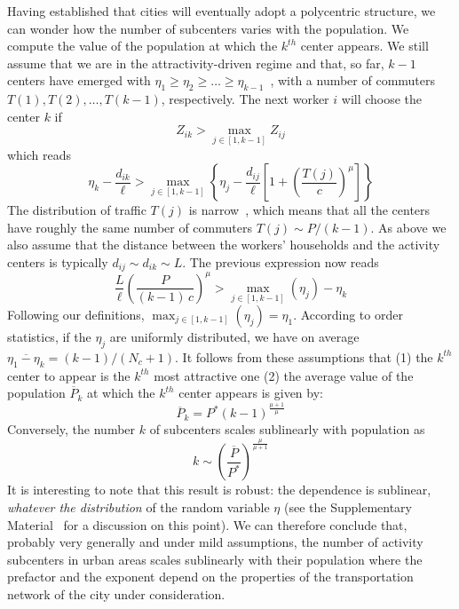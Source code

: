 Having established that cities will eventually adopt a polycentric
structure, we can wonder how the number of subcenters varies with the
population. We compute the value of the population at which 
the $k^{th}$ center appears. We still assume that we are in the attractivity-driven regime and that, so far, $k-1$
centers have emerged with $\eta_{1} \geq \eta_{2} \geq \ldots \geq
\eta_{k-1}$~\cite{SM}, with a number of commuters $T(1), T(2), \ldots,
T(k-1)$, respectively. The next worker $i$ will choose the center $k$ if
\begin{equation}
Z_{ik} > \max_{j \in \left[1,k-1\right]} Z_{ij}
\end{equation}
which reads
\begin{equation}
\eta_k - \frac{d_{ik}}{\ell} > \max_{j \in \left[1,k-1\right]} \left\{
\eta_j - \frac{d_{ij}}{\ell} \left[ 1 + \left(
  \frac{T(j)}{c}\right)^\mu\right] \right\}
\end{equation}
The distribution of traffic $T(j)$ is narrow~\cite{SM}, which means that all the centers have roughly the same number of
commuters $T(j) \sim P/(k-1)$. As above we also assume that the
distance between the workers' households and the activity centers is
typically $d_{ij} \sim d_{ik} \sim L$. The previous expression now
reads
\begin{equation}
\frac{L}{\ell} \left( \frac{P}{(k-1)\,c} \right)^{\mu} > \max_{j \in
  \left[1,k-1\right]} \left( \eta_j \right) - \eta_k
\end{equation}
Following our definitions, $\max_{j \in \left[1,k-1\right]} \left(
\eta_j \right) = \eta_1$. According to order statistics, if the
$\eta_j$ are uniformly distributed, we have on average
$\overline{\eta_1 - \eta_k} = (k-1)/(N_c+1)$. It follows from these
assumptions that (1) the $k^{th}$ center to appear is the $k^{th}$ most attractive one (2) the average value of the population $\overline{P}_k$ at
which the $k^{th}$ center appears is given by:
%
\begin{equation}
\overline{P}_k = P^* \left( k-1 \right)^{\frac{\mu+1}{\mu}}
\label{eq:prediction}
\end{equation}
%
Conversely, the number $k$ of subcenters scales sublinearly with population as
\begin{equation}
k \sim \left( \frac{\overline{P}}{P^*} \right)^{\frac{\mu}{\mu + 1}}
\end{equation}
It is interesting to note that this result is robust: the dependence
is sublinear, \emph{whatever the distribution} of the random variable
$\eta$ (see the Supplementary Material~\cite{SM} for a discussion on this
point). We can therefore conclude that, probably very generally and
under mild assumptions, the number of activity subcenters in urban
areas scales sublinearly with their population where the prefactor and
the exponent depend on the properties of the transportation network of
the city under consideration. 

